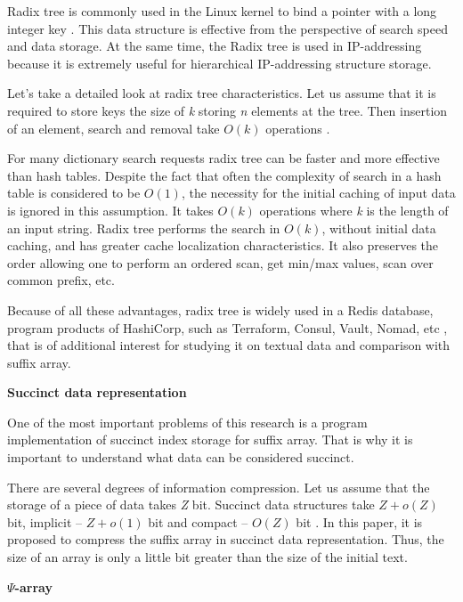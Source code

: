 Radix tree is commonly used in the Linux kernel to bind a pointer with a long integer key \cite{Linux2018}.
This data structure is effective from the perspective of search speed and data storage.
At the same time, the Radix tree is used in IP-addressing because it is extremely useful for
hierarchical IP-addressing structure \cite{Radix2019} storage.

Let's take a detailed look at radix tree characteristics. Let us assume that it is required
to store keys the size of \emph{k} storing \emph{n} elements at the tree. Then insertion of an element,
search and removal take $O(k)$ operations \cite{leis2013adaptive}.

For many dictionary search requests radix tree can be faster and more effective than hash tables.
Despite the fact that often the complexity of search in a hash table is considered to be $O(1)$,
the necessity for the initial caching of input data is ignored in this assumption.
It takes $O(k)$ operations where \emph{k} is the length of an input string.
Radix tree performs the search in $O(k)$, without initial data caching, and has greater
cache localization characteristics.
It also preserves the order allowing one to perform an ordered scan,
get min/max values, scan over common prefix, etc.

Because of all these advantages, radix tree is widely used in a Redis database, program
products of HashiCorp, such as Terraform, Consul, Vault, Nomad, etc \cite{Redis2018},
that is of additional interest for studying it on textual data and comparison with suffix array.

\textbf{Succinct data representation}

One of the most important problems of this research is
a program implementation of succinct index storage for suffix array.
That is why it is important to understand what data can be considered succinct.

There are several degrees of information compression.
Let us assume that the storage of a piece of data takes \emph{Z} bit.
Succinct data structures take \(Z + o(Z)\) bit, implicit -- \(Z + o(1)\) bit and
compact -- \(O(Z)\) bit \cite{huo2014practical}. In this paper, it is proposed to
compress the suffix array in succinct data representation.
Thus, the size of an array is only a little bit greater than the size of the initial text.

\textbf{$\Psi$-array}

